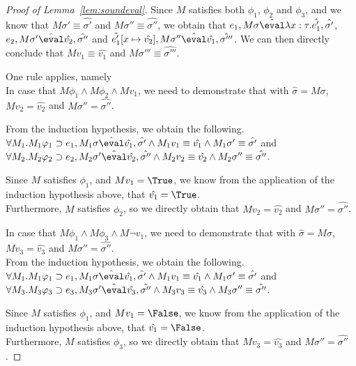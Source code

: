 \begin{proof}[Proof of Lemma~\ref{lem:soundeval}]
{  Since $M$ satisfies both $\phi_1$, $\phi_2$ and $\phi_3$, and we know that
  $M\sigma' \equiv\hat{\sigma'}$ and $M\sigma'' \equiv\hat{\sigma''}$,
  we obtain that $e_1,M\sigma \hat{\eval}\lambda x : \tau.\hat{e_1'},\hat{\sigma'}$, $e_2,M\sigma' \hat{\eval}\hat{v_2},\hat{\sigma''}$ and $\hat{e_1'}[x\mapsto \hat{v_2}],M\sigma'' \hat{\eval}\hat{v_1},\hat{\sigma'''}$.
  We can then directly conclude that $M v_1 \equiv \hat{v_1}$ and $M\sigma'''\equiv\hat{\sigma'''}$.
  }

   {One rule applies, namely \\

   In case that $M\phi_1\land M\phi_2 \land Mv_1$,
   we need to demonstrate that
    with $\hat{\sigma}=M\sigma$,
   $M v_2 = \hat{v_2}$ and $M\sigma''=\hat{\sigma''}$.

   From the induction hypothesis, we obtain the following.\\
   $\forall M_1 . M_1\phi_1 \implies e_1,M_1\sigma\hat{\eval}\hat{v_1},\hat{\sigma'}
   \land M_1v_1 \equiv \hat{v_1} \land M_1\sigma'\equiv\hat{\sigma'}$
   and\\
   $\forall M_2 . M_2\phi_2 \implies e_2,M_2\sigma'\hat{\eval}\hat{v_2},\hat{\sigma''}
   \land M_2 v_2 \equiv \hat{v_2} \land M_2\sigma'' \equiv\hat{\sigma''}$.

   Since $M$ satisfies $\phi_1$, and $M v_1=\True$, we know from the application of the induction hypothesis above, that $\hat{v_1}=\True$.\\
   Furthermore, $M$ satisfies $\phi_2$, so we directly obtain that $Mv_2=\hat{v_2}$ and $M\sigma''=\hat{\sigma''}$.

   In case that $M\phi_1\land M\phi_3 \land M\neg v_1$,
   we need to demonstrate that
    with $\hat{\sigma}=M\sigma$,
   $M v_3 = \hat{v_3}$ and $M\sigma''=\hat{\sigma''}$.\\

   From the induction hypothesis, we obtain the following.\\
   $\forall M_1 . M_1\phi_1 \implies e_1,M_1\sigma\hat{\eval}\hat{v_1},\hat{\sigma'}
   \land M_1v_1 \equiv \hat{v_1} \land M_1\sigma'\equiv\hat{\sigma'}$
   and\\
   $\forall M_3 . M_3\phi_3 \implies e_3,M_3\sigma'\hat{\eval}\hat{v_3},\hat{\sigma''}
   \land M_3 v_3 \equiv \hat{v_3} \land M_3\sigma'' \equiv\hat{\sigma''}$.

   Since $M$ satisfies $\phi_1$, and $M v_1=\False$, we know from the application of the induction hypothesis above, that $\hat{v_1}=\False$.\\
   Furthermore, $M$ satisfies $\phi_3$, so we directly obtain that $Mv_3=\hat{v_3}$ and $M\sigma''=\hat{\sigma''}$.
  }


\end{proof}
